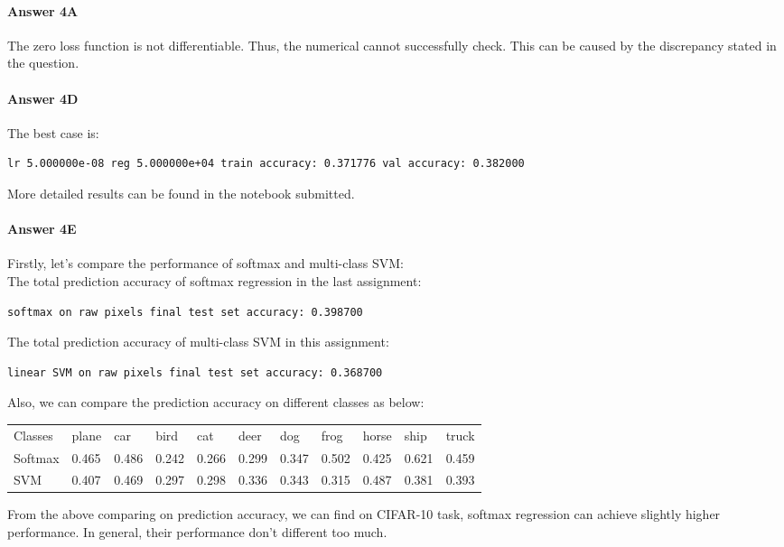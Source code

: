 \documentclass[paper=a4, fontsize=11pt]{scrartcl} %
\numberwithin{equation}{section} %
\numberwithin{figure}{section} %
\numberwithin{table}{section} %
\begin{document}
\paragraph{\textbf{Answer 4A}}
The zero loss function is not differentiable. Thus, the numerical cannot successfully check. This can be caused by the discrepancy stated in the question.
\paragraph{\textbf{Answer 4D}}
The best case is: 
\begin{verbatim}
lr 5.000000e-08 reg 5.000000e+04 train accuracy: 0.371776 val accuracy: 0.382000
\end{verbatim}
More detailed results can be found in the notebook submitted.

\paragraph{\textbf{Answer 4E}}
Firstly, let's compare the performance of softmax and multi-class SVM:
\\ The total prediction accuracy of softmax regression in the last assignment:
\begin{verbatim}
softmax on raw pixels final test set accuracy: 0.398700
\end{verbatim}
The total prediction accuracy of multi-class SVM in this assignment:
\begin{verbatim}
linear SVM on raw pixels final test set accuracy: 0.368700
\end{verbatim}
Also, we can compare the prediction accuracy on different classes as below:
\begin{table}[H]
	\centering
	\label{comparing_table}
	\begin{tabular}{lllllllllll}
	Classes            & plane & car   & bird  & cat   & deer  & dog   & frog  & horse & ship  & truck \\
	Softmax & 0.465 & 0.486 & 0.242 & 0.266 & 0.299 & 0.347 & 0.502 & 0.425 & 0.621 & 0.459 \\
	SVM                & 0.407 & 0.469 & 0.297 & 0.298 & 0.336 & 0.343 & 0.315 & 0.487 & 0.381 & 0.393 
	\end{tabular}
\end{table}
From the above comparing on prediction accuracy, we can find on CIFAR-10 task, softmax regression can achieve slightly higher performance. In general, their performance don't different too much.
\end{document}
